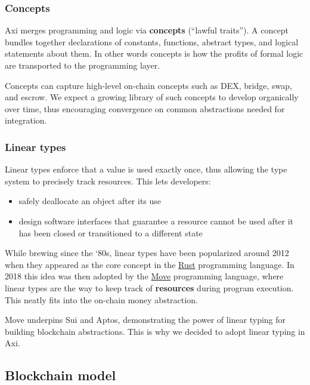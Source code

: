 \documentclass[a4paper]{article}
\begin{document}
\subsubsection{Concepts}

Axi merges programming and logic via \textbf{concepts} (``lawful traits''). A concept bundles together declarations of constants, functions, abstract types, and logical statements about them. In other words concepts is how the profits of formal logic are transported to the programming layer.

Concepts can capture high-level on-chain concepts such as DEX, bridge, swap, and escrow. We expect a growing library of such concepts to develop organically over time, thus encouraging convergence on common abstractions needed for integration.

\subsubsection{Linear types}

Linear types enforce that a value is used exactly once, thus allowing the type system to precisely track resources. This lets developers:

\begin{itemize}
  \item safely deallocate an object after its use
  \item design software interfaces that guarantee a resource cannot be used after it has been closed or transitioned to a different state
\end{itemize}

While brewing since the ‘80s, linear types have been popularized around 2012 when they appeared as the core concept in the \href{https://en.wikipedia.org/wiki/Rust_(programming_language)}{Rust} programming language. In 2018 this idea was then adopted by the \href{https://move-book.com/}{Move} programming language, where linear types are the way to keep track of \textbf{resources} during program execution. This neatly fits into the on-chain money abstraction.

Move underpins Sui and Aptos, demonstrating the power of linear typing for building blockchain abstractions. This is why we decided to adopt linear typing in Axi.

\subsection{Blockchain model}
\end{document}
